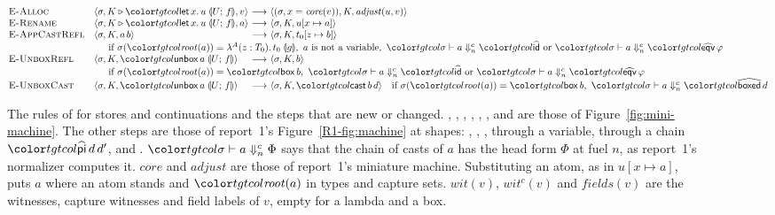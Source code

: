\begin{figure}[t]
\small
\color{tgtcol}
\[
\begin{array}{@{}l@{\quad}l@{\ }c@{\ }l@{}}
\rn{E-Alloc} & \mst{\sigma}{K \triangleright \frlet{x}{u}{U}{f}}{v} &\step& \mst{(\sigma, x = \mathit{core}(v))}{K}{\mathit{adjust}(u, v)} \\
\rn{E-Rename} & \mst{\sigma}{K \triangleright \frlet{x}{u}{U}{f}}{a} &\step& \mst{\sigma}{K}{u[x \mapsto a]} \\
\rn{E-AppCastRefl} & \mst{\sigma}{K}{a\,b} &\step& \mst{\sigma}{K}{t_0[z \mapsto b]} \\
& \multicolumn{3}{l}{\quad \text{if } \sigma(\rt{a}) = \lamc{A}{z}{T_0}{t_0}{g},\ a \text{ is not a variable},\ \chn{\sigma}{a}{n}{\form{id}} \text{ or } \chn{\sigma}{a}{n}{\form{eqv}\,\varphi}} \\
\rn{E-UnboxRefl} & \mst{\sigma}{K}{\unboxc{a}{U}{f}} &\step& \mst{\sigma}{K}{b} \\
& \multicolumn{3}{l}{\quad \text{if } \sigma(\rt{a}) = \ev{box}\,b,\ \chn{\sigma}{a}{n}{\form{id}} \text{ or } \chn{\sigma}{a}{n}{\form{eqv}\,\varphi}} \\
\rn{E-UnboxCast} & \mst{\sigma}{K}{\unboxc{a}{U}{f}} &\step& \mst{\sigma}{K}{\ev{cast}\,b\,d} \quad \text{if } \sigma(\rt{a}) = \ev{box}\,b,\ \chn{\sigma}{a}{n}{\form{boxed}\,d}
\end{array}
\]
\color{black}
\caption{The rules of \treeK for stores and continuations and the steps that are new or changed. , , , , , ,  and  are those of Figure~\ref{fig:mini-machine}. The other steps are those of report~1's Figure~\ref{R1-fig:machine} at shapes: , , ,  through a variable,  through a chain $\form{pi}\,d\,d'$, and . $\chn{\sigma}{a}{n}{\Phi}$ says that the chain of casts of $a$ has the head form $\Phi$ at fuel $n$, as report~1's normalizer computes it. $\mathit{core}$ and $\mathit{adjust}$ are those of report~1's miniature machine. Substituting an atom, as in $u[x \mapsto a]$, puts $a$ where an atom stands and $\rt{a}$ in types and capture sets. $\mathit{wit}(v)$, $\mathit{wit}^{c}(v)$ and $\mathit{fields}(v)$ are the witnesses, capture witnesses and field labels of $v$, empty for a lambda and a box.}
\label{fig:target-machine}
\end{figure}


